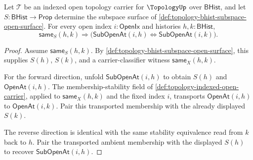 \begin{theorem}
\label{thm:topology-subspace-open-carrier-transport}
Let $\mathcal{T}$ be an indexed open topology carrier for $\TopologyUp$ over $\mathsf{BHist}$, and let $S:\mathsf{BHist}\to\mathsf{Prop}$ determine the subspace surface of \autoref{def:topology-bhist-subspace-open-surface}. For every open index $i:\mathsf{OpenIx}$ and histories $h,k:\mathsf{BHist}$,
$$
\mathsf{same}_S(h,k)
\Longrightarrow
\bigl(\mathsf{SubOpenAt}(i,h)\Longleftrightarrow\mathsf{SubOpenAt}(i,k)\bigr).
$$
\end{theorem}
\begin{proof}
Assume $\mathsf{same}_S(h,k)$. By \autoref{def:topology-bhist-subspace-open-surface}, this supplies $S(h)$, $S(k)$, and a carrier-classifier witness $\mathsf{same}_X(h,k)$.

For the forward direction, unfold $\mathsf{SubOpenAt}(i,h)$ to obtain $S(h)$ and $\mathsf{OpenAt}(i,h)$. The membership-stability field of \autoref{def:topology-indexed-open-carrier}, applied to $\mathsf{same}_X(h,k)$ and the fixed index $i$, transports $\mathsf{OpenAt}(i,h)$ to $\mathsf{OpenAt}(i,k)$. Pair this transported membership with the already displayed $S(k)$.

The reverse direction is identical with the same stability equivalence read from $k$ back to $h$. Pair the transported ambient membership with the displayed $S(h)$ to recover $\mathsf{SubOpenAt}(i,h)$.
\end{proof}

